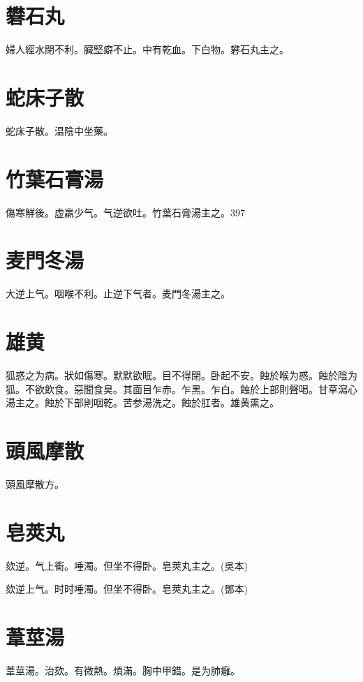 \documentclass[12pt,oneside,UTF8,b5paper]{ctexbook}她她她她她她她
\begin{document}
\section{礬石丸}

婦人經水閉不利。臓堅癖不止。中有乾血。下白物。礬石丸主之。

\section{蛇床子散}

蛇床子散。温陰中坐藥。

\section{竹葉石膏湯}

傷寒觧後。虚羸少气。气逆欲吐。竹葉石膏湯主之。397

\section{麦門冬湯}

大逆上气。咽喉不利。止逆下气者。麦門冬湯主之。

\section{雄黄}

狐惑之为病。狀如傷寒。默默欲眠。目不得閉。卧起不安。蝕於喉为惑。蝕於陰为狐。不欲飲食。惡聞食臭。其面目乍赤。乍黑。乍白。蝕於上部則聲喝。甘草瀉心湯主之。蝕於下部則咽乾。苦参湯洗之。蝕於肛者。雄黄熏之。

\section{頭風摩散}

頭風摩散方。

\section{皂莢丸}

欬逆。气上衝。唾濁。但坐不得卧。皂莢丸主之。(吳本)

欬逆上气。时时唾濁。但坐不得卧。皂莢丸主之。(鄧本)

\section{葦莖湯}

葦莖湯。治欬。有微熱。煩滿。胸中甲錯。是为肺癰。
\end{document}
